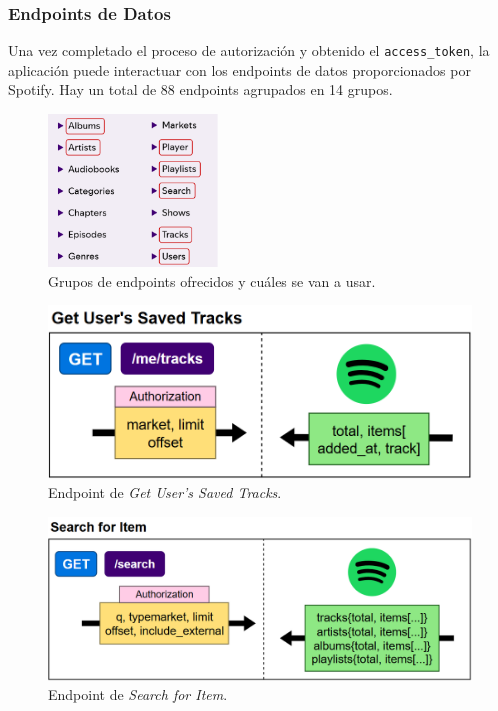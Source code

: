 \subsubsection{Endpoints de Datos}

Una vez completado el proceso de autorización y obtenido el \texttt{access\_token}, la aplicación puede interactuar con los endpoints de datos proporcionados por Spotify. Hay un total de 88 endpoints agrupados en 14 grupos.

\begin{figure}[H]
    \centering
    \includegraphics[width=0.4\textwidth]{figures/selected_groups.png}
    \caption{Grupos de endpoints ofrecidos y cuáles se van a usar.}
    \label{fig:selected_groups}
\end{figure}


\begin{figure}[H]
    \centering
    \includegraphics[width=\textwidth]{figures/endpoints/get_users_saved_tracks.png}
    \caption{Endpoint de \textit{Get User's Saved Tracks}.}
    \label{fig:get_usr_saved_tracks}
\end{figure}

\begin{figure}[H]
    \centering
    \includegraphics[width=\textwidth]{figures/endpoints/search_for_item.png}
    \caption{Endpoint de \textit{Search for Item}.}
    \label{fig:search_item}
\end{figure}

